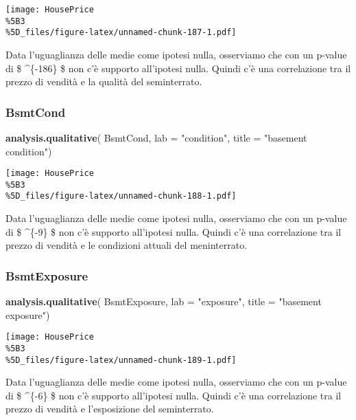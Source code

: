 \documentclass[
]{article}
\newenvironment{Shaded}{\begin{snugshade}}{\end{snugshade}}
\newcommand{\AttributeTok}[1]{\textcolor[rgb]{0.13,0.29,0.53}{#1}}
\newcommand{\FunctionTok}[1]{\textcolor[rgb]{0.13,0.29,0.53}{\textbf{#1}}}
\newcommand{\NormalTok}[1]{#1}
\newcommand{\StringTok}[1]{\textcolor[rgb]{0.31,0.60,0.02}{#1}}
\begin{document}
\texttt{[image: HousePrice\\\%5B3\\\%5D\_files/figure-latex/unnamed-chunk-187-1.pdf]}

Data l'uguaglianza delle medie come ipotesi nulla, osserviamo che con un
p-value di \$ \^{}\{-186\} \$ non c'è supporto all'ipotesi
nulla. Quindi c'è una correlazione tra il prezzo di vendità e la qualità
del seminterrato.

\subsubsection{BsmtCond}\label{bsmtcond-1}

\begin{Shaded}
\begin{Highlighting}[]
\FunctionTok{analysis.qualitative}\NormalTok{(}
\NormalTok{    BsmtCond,}
    \AttributeTok{lab =} \StringTok{"condition"}\NormalTok{,}
    \AttributeTok{title =} \StringTok{"basement condition"}\NormalTok{)}
\end{Highlighting}
\end{Shaded}

\texttt{[image: HousePrice\\\%5B3\\\%5D\_files/figure-latex/unnamed-chunk-188-1.pdf]}

Data l'uguaglianza delle medie come ipotesi nulla, osserviamo che con un
p-value di \$ \^{}\{-9\} \$ non c'è supporto all'ipotesi
nulla. Quindi c'è una correlazione tra il prezzo di vendità e le
condizioni attuali del meninterrato.

\subsubsection{BsmtExposure}\label{bsmtexposure-1}

\begin{Shaded}
\begin{Highlighting}[]
\FunctionTok{analysis.qualitative}\NormalTok{(}
\NormalTok{    BsmtExposure,}
    \AttributeTok{lab =} \StringTok{"exposure"}\NormalTok{,}
    \AttributeTok{title =} \StringTok{"basement exposure"}\NormalTok{)}
\end{Highlighting}
\end{Shaded}

\texttt{[image: HousePrice\\\%5B3\\\%5D\_files/figure-latex/unnamed-chunk-189-1.pdf]}

Data l'uguaglianza delle medie come ipotesi nulla, osserviamo che con un
p-value di \$ \^{}\{-6\} \$ non c'è supporto all'ipotesi
nulla. Quindi c'è una correlazione tra il prezzo di vendità e
l'esposizione del seminterrato.
\end{document}
